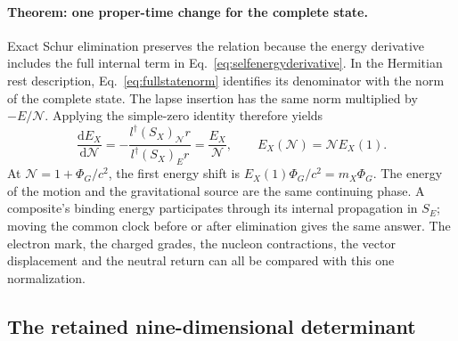 \documentclass[aps,prx,onecolumn,10pt,notitlepage,nofootinbib,longbibliography]{revtex4-2}
\numberwithin{equation}{section}
\numberwithin{table}{section}
\newcommand{\dd}{\mathrm d}
\begin{document}
\paragraph*{Theorem: one proper-time change for the complete state.}
Exact Schur elimination preserves the relation because the energy derivative includes the full internal term in Eq.~\eqref{eq:selfenergyderivative}. In the Hermitian rest description, Eq.~\eqref{eq:fullstatenorm} identifies its denominator with the norm of the complete state. The lapse insertion has the same norm multiplied by $-E/{\mathcal N}$. Applying the simple-zero identity therefore yields
\begin{equation}
 \frac{\dd E_X}{\dd {\mathcal N}}
 =-\frac{l^\dagger(S_X)_{\mathcal N}r}{l^\dagger(S_X)_Er}
 =\frac{E_X}{{\mathcal N}},\qquad E_X({\mathcal N})={\mathcal N}E_X(1).
 \label{eq:fullclock}
\end{equation}
At ${\mathcal N}=1+\Phi_G/c^2$, the first energy shift is $E_X(1)\Phi_G/c^2=m_X\Phi_G$. The energy of the motion and the gravitational source are the same continuing phase. A composite's binding energy participates through its internal propagation in $S_E$; moving the common clock before or after elimination gives the same answer. The electron mark, the charged grades, the nucleon contractions, the vector displacement and the neutral return can all be compared with this one normalization.

\subsection{The retained nine-dimensional determinant}
\end{document}
